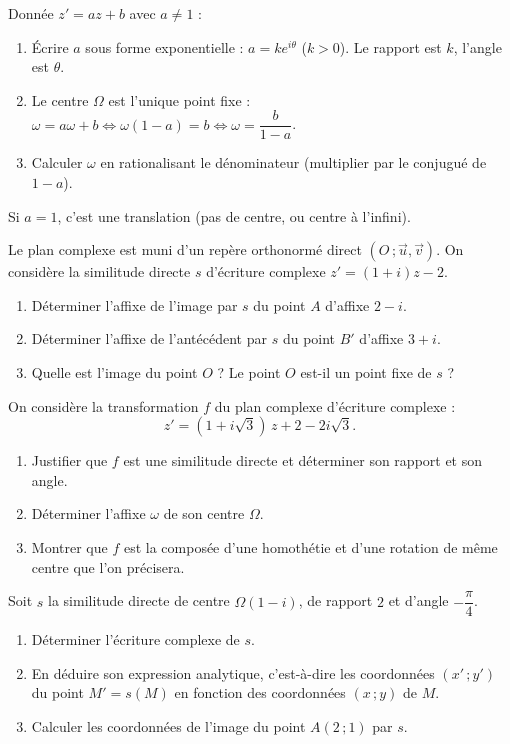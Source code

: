 \documentclass[11pt]{article}
\newcounter{popsec}
\newcounter{popsub}
\newcommand{\courssub}[1]{%
  \stepcounter{popsub}%
  \par\vspace{9pt}\noindent{\popxbold\fontsize{11.5}{13}\selectfont\color{popink}{\color{poporange}\thepopsec.\thepopsub}\hspace{6pt}#1}\par\nopagebreak\vspace{4pt}
}
\begin{document}
\begin{methode}
Donnée $z' = az + b$ avec $a \neq 1$ :
\begin{enumerate}
\item Écrire $a$ sous forme exponentielle : $a = k e^{i\theta}$ ($k>0$). Le rapport est $k$, l'angle est $\theta$.
\item Le centre $\Omega$ est l'unique point fixe : $\omega = a\omega + b \iff \omega(1-a) = b \iff \omega = \dfrac{b}{1-a}$.
\item Calculer $\omega$ en rationalisant le dénominateur (multiplier par le conjugué de $1-a$).
\end{enumerate}
Si $a=1$, c'est une translation (pas de centre, ou centre à l'infini).
\end{methode}

\begin{exercice}
Le plan complexe est muni d'un repère orthonormé direct $(O\,;\vec{u},\vec{v})$. On considère la similitude directe $s$ d'écriture complexe $z' = (1 + i)z - 2$.
\begin{enumerate}
\item Déterminer l'affixe de l'image par $s$ du point $A$ d'affixe $2 - i$.
\item Déterminer l'affixe de l'antécédent par $s$ du point $B'$ d'affixe $3 + i$.
\item Quelle est l'image du point $O$ ? Le point $O$ est-il un point fixe de $s$ ?
\end{enumerate}
\end{exercice}

\courssub{Je m'entraîne}

\begin{exercice}
On considère la transformation $f$ du plan complexe d'écriture complexe :
\[ z' = (1 + i\sqrt{3})\,z + 2 - 2i\sqrt{3}. \]
\begin{enumerate}
\item Justifier que $f$ est une similitude directe et déterminer son rapport et son angle.
\item Déterminer l'affixe $\omega$ de son centre $\Omega$.
\item Montrer que $f$ est la composée d'une homothétie et d'une rotation de même centre que l'on précisera.
\end{enumerate}
\end{exercice}

\begin{exercice}
Soit $s$ la similitude directe de centre $\Omega(1 - i)$, de rapport $2$ et d'angle $-\dfrac{\pi}{4}$.
\begin{enumerate}
\item Déterminer l'écriture complexe de $s$.
\item En déduire son expression analytique, c'est-à-dire les coordonnées $(x'\,; y')$ du point $M' = s(M)$ en fonction des coordonnées $(x\,; y)$ de $M$.
\item Calculer les coordonnées de l'image du point $A(2\,; 1)$ par $s$.
\end{enumerate}
\end{exercice}
\end{document}
